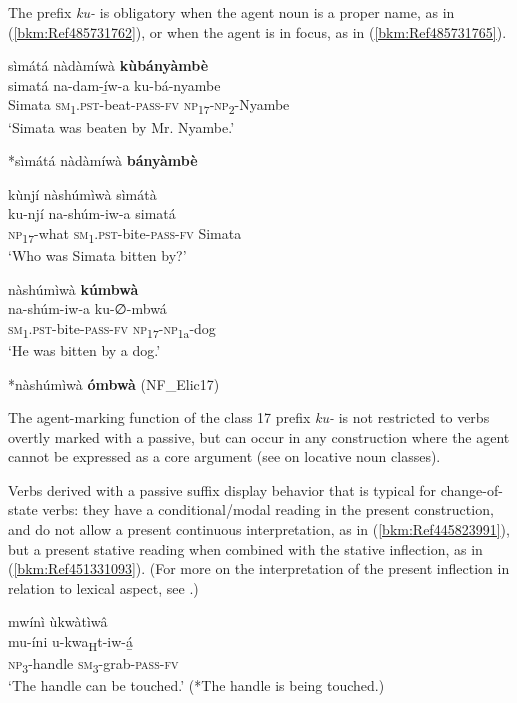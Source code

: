 The prefix \textit{ku-} is obligatory when the agent noun is a proper name, as in (\ref{bkm:Ref485731762}), or when the agent is in focus, as in (\ref{bkm:Ref485731765}).

\ea
\label{bkm:Ref485731762}
\ea
sìmátá nàdàmíwà \textbf{kùbányàmbè}\\
\gll simatá    na-dam-í̲w-a      ku-bá-nyambe\\
Simata  \textsc{sm}\textsubscript{1}.\textsc{pst}-beat-\textsc{pass}-\textsc{fv}  \textsc{np}\textsubscript{17}-\textsc{np}\textsubscript{2}-Nyambe\\
\glt ‘Simata was beaten by Mr. Nyambe.’

\ex
*sìmátá nàdàmíwà \textbf{bányàmbè}
\z\z

\ea
\label{bkm:Ref485731765}
\ea
kùnjí nàshúmìwà sìmátà\\
\gll ku-njí    na-shúm-iw-a    simatá\\
\textsc{np}\textsubscript{17}-what  \textsc{sm}\textsubscript{1}.\textsc{pst}-bite-\textsc{pass}-\textsc{fv}  Simata\\
\glt ‘Who was Simata bitten by?’

\ex
nàshúmìwà \textbf{kúmbwà}\\
\gll na-shúm-iw-a    ku-∅-mbwá\\
\textsc{sm}\textsubscript{1}.\textsc{pst}-bite-\textsc{pass}-\textsc{fv}  \textsc{np}\textsubscript{17}-\textsc{np}\textsubscript{1a}-dog\\
\glt ‘He was bitten by a dog.’

\ex
  *nàshúmìwà \textbf{ómbwà} (NF\_Elic17)
\z\z

The agent-marking function of the class 17 prefix \textit{ku-} is not restricted to verbs overtly marked with a passive, but can occur in any construction where the agent cannot be expressed as a core argument (see  on locative noun classes).

Verbs derived with a passive suffix display behavior that is typical for change-of-state verbs: they have a conditional/modal reading in the present construction, and do not allow a present continuous interpretation, as in (\ref{bkm:Ref445823991}), but a present stative reading when combined with the stative inflection, as in (\ref{bkm:Ref451331093}). (For more on the interpretation of the present inflection in relation to lexical aspect, see .)

\ea
\label{bkm:Ref445823991}
mwínì ùkwàtìwâ\\
\gll mu-íni  u-kwa\textsubscript{H}t-iw-á̲\\
\textsc{np}\textsubscript{3}-handle  \textsc{sm}\textsubscript{3}-grab-\textsc{pass}-\textsc{fv}\\
\glt ‘The handle can be touched.’ (*The handle is being touched.)
\z

